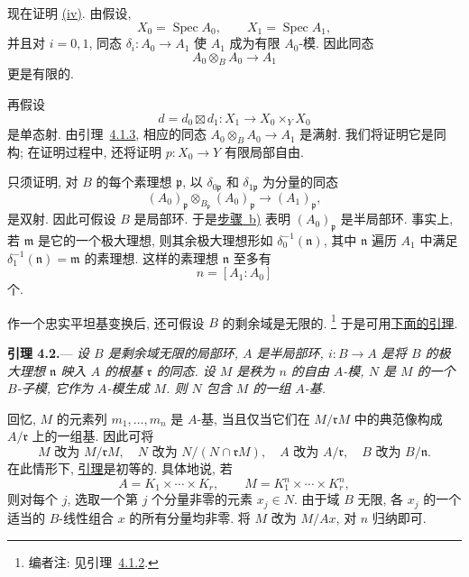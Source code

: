 
\label{proof:sga3-V-4.1-iv-affine}%
现在证明 \hyperref[thm:sga3-V-4.1-iv]{(iv)}. 由假设,
\[
  X_0=\operatorname{Spec}A_0,\qquad
  X_1=\operatorname{Spec}A_1,
\]
并且对 \(i=0,1\), 同态
\(\delta_i:A_0\to A_1\) 使 \(A_1\) 成为有限 \(A_0\)-模.
因此同态
\[
  A_0\otimes_BA_0\longrightarrow A_1
\]
更是有限的.

再假设
\[
  d=d_0\boxtimes d_1:X_1\longrightarrow X_0\times_YX_0
\]
是单态射. 由引理~\hyperref[lem:sga3-V-4.1.3]{4.1.3},
相应的同态 \(A_0\otimes_BA_0\to A_1\) 是满射.
我们将证明它是同构; 在证明过程中, 还将证明
\(p:X_0\to Y\) 有限局部自由.

只须证明, 对 \(B\) 的每个素理想 \(\mathfrak p\),
以 \(\delta_{0\mathfrak p}\) 和 \(\delta_{1\mathfrak p}\) 为分量的同态
\[
  (A_0)_{\mathfrak p}\otimes_{B_{\mathfrak p}}(A_0)_{\mathfrak p}
  \longrightarrow(A_1)_{\mathfrak p},
\]
是双射. 因此可假设 \(B\) 是局部环.
于是\hyperref[proof:sga3-V-4.1-b]{步骤~b)} 表明 \((A_0)_{\mathfrak p}\)
是半局部环. 事实上, 若 \(\mathfrak m\) 是它的一个极大理想,
则其余极大理想形如 \(\delta_0^{-1}(\mathfrak n)\),
其中 \(\mathfrak n\) 遍历 \(A_1\) 中满足
\(\delta_1^{-1}(\mathfrak n)=\mathfrak m\) 的素理想.
这样的素理想 \(\mathfrak n\) 至多有
\[
  n=[A_1:A_0]
\]
个.

作一个忠实平坦基变换后, 还可假设 \(B\) 的剩余域是无限的.%
\footnote{\label{note:sga3-V-25}编者注: 见引理~\hyperref[lem:sga3-V-4.1.2]{4.1.2}.}
于是可用\hyperref[lem:sga3-V-4.2]{下面的引理}.

\medskip
{}\label{lem:sga3-V-4.2}%
\noindent\textbf{引理 4.2.}---
\textit{设 \(B\) 是剩余域无限的局部环, \(A\) 是半局部环,
\(i:B\to A\) 是将 \(B\) 的极大理想 \(\mathfrak n\)
映入 \(A\) 的根基 \(\mathfrak r\) 的同态.
设 \(M\) 是秩为 \(n\) 的自由 \(A\)-模,
\(N\) 是 \(M\) 的一个 \(B\)-子模, 它作为 \(A\)-模生成 \(M\).
则 \(N\) 包含 \(M\) 的一组 \(A\)-基.}

回忆, \(M\) 的元素列 \(m_1,\ldots,m_n\) 是 \(A\)-基,
当且仅当它们在 \(M/\mathfrak rM\) 中的典范像构成
\(A/\mathfrak r\) 上的一组基. 因此可将
\[
  M\text{ 改为 }M/\mathfrak rM,\quad
  N\text{ 改为 }N/(N\cap\mathfrak rM),\quad
  A\text{ 改为 }A/\mathfrak r,\quad
  B\text{ 改为 }B/\mathfrak n.
\]
在此情形下, \hyperref[lem:sga3-V-4.2]{引理}是初等的. 具体地说, 若
\[
  A=K_1\times\cdots\times K_r,
  \qquad
  M=K_1^n\times\cdots\times K_r^n,
\]
则对每个 \(j\), 选取一个第 \(j\) 个分量非零的元素 \(x_j\in N\).
由于域 \(B\) 无限, 各 \(x_j\) 的一个适当的 \(B\)-线性组合 \(x\)
的所有分量均非零. 将 \(M\) 改为 \(M/Ax\), 对 \(n\) 归纳即可.

